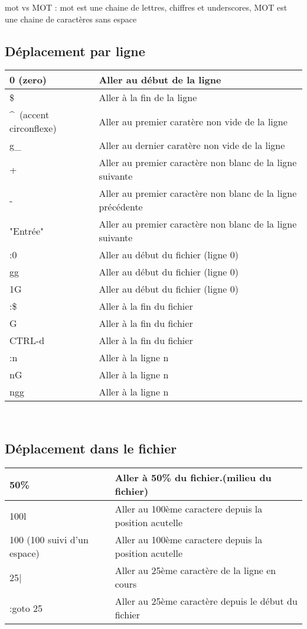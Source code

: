 \documentclass{article}
\begin{document}
mot vs MOT : mot est une chaine de lettres, chiffres et underscores, MOT est une chaine de caractères sans espace\\

\subsection{Déplacement par ligne}
\begin{tabular}{|p{3cm}| l| }
\hline
0 (zero) & Aller au début de la ligne \\ \hline
\$ & Aller à la fin de la ligne \\ \hline
\^~(accent circonflexe) & Aller au premier caratère non vide de la ligne \\ \hline
g\_ & Aller au dernier caratère non vide de la ligne \\ \hline
+ & Aller au premier caractère non blanc de la ligne suivante \\ \hline
- & Aller au premier caractère non blanc de la ligne précédente \\ \hline
"Entrée" & Aller au premier caractère non blanc de la ligne suivante\\ \hline
:0 & Aller au début du fichier (ligne 0) \\ \hline
gg & Aller au début du fichier (ligne 0) \\ \hline
1G & Aller au début du fichier (ligne 0) \\ \hline
:\$ & Aller à la fin du fichier\\ \hline
G & Aller à la fin du fichier\\ \hline
CTRL-d & Aller à la fin du fichier\\ \hline
:n & Aller à la ligne n\\ \hline
nG & Aller à la ligne n\\ \hline
ngg & Aller à la ligne n\\ \hline
\end{tabular}\\[0.5cm]


\subsection{Déplacement dans le fichier}
\begin{tabular}{|p{3cm}| l| }
\hline
  50\% & Aller à 50\% du fichier.(milieu du fichier) \\ \hline
  100l & Aller au 100ème caractere depuis la position acutelle \\ \hline
  100 (100 suivi d'un espace) & Aller au 100ème caractere depuis la position acutelle \\ \hline
  25| & Aller au 25ème caractère de la ligne en cours\\ \hline
  :goto 25 & Aller au 25ème caractère depuis le début du fichier\\ \hline
\end{tabular}\\
\end{document}
